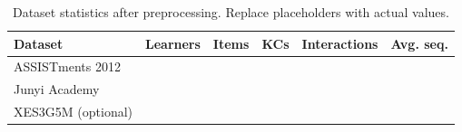 \begin{table}[t]
\centering
\caption{Dataset statistics after preprocessing. Replace placeholders with actual values.}
\label{tab:datasets}
\footnotesize
\begin{tabular}{lrrrrr}
\toprule
Dataset & Learners & Items & KCs & Interactions & Avg. seq. \\
\midrule
ASSISTments 2012 & \todo{} & \todo{} & \todo{} & \todo{} & \todo{} \\
Junyi Academy & \todo{} & \todo{} & \todo{} & \todo{} & \todo{} \\
XES3G5M (optional) & \todo{} & \todo{} & \todo{} & \todo{} & \todo{} \\
\bottomrule
\end{tabular}
\end{table}

